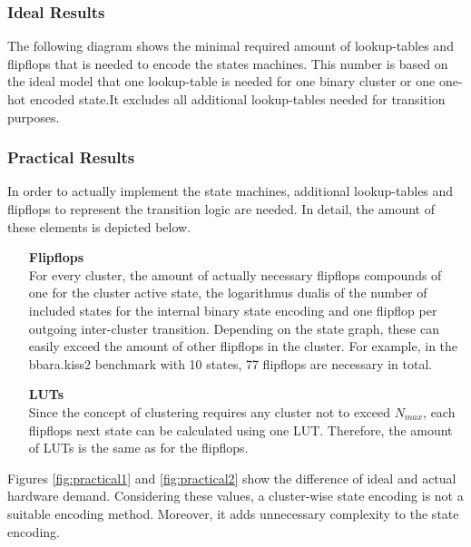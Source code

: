 \subsubsection{Ideal Results}
\label{subsubsec:IResults}

The following diagram shows the minimal required amount of lookup-tables and flipflops that is needed to encode the states machines. This number is based on the ideal model that one lookup-table is needed for one binary cluster or one one-hot encoded state.It excludes all additional lookup-tables needed for transition purposes.



\subsubsection{Practical Results}
\label{subsubsec:PResults}

In order to actually implement the state machines, additional lookup-tables and flipflops to represent the transition logic are needed. In detail, the amount of these elements is depicted below.

\begin{itemize}
\item[\textbf{Flipflops}]\hfill \\
For every cluster, the amount of actually necessary flipflops compounds of one for the cluster active state, the logarithmus dualis of the number of included states for the internal binary state encoding and one flipflop per outgoing inter-cluster transition. Depending on the state graph, these can easily exceed the amount of other flipflops in the cluster. For example,
in the bbara.kiss2 benchmark with 10 states, 77 flipflops are necessary in total.
\item[\textbf{LUTs}]\hfill \\
Since the concept of clustering requires any cluster not to exceed $N_{max}$, each flipflops next state can be calculated using one LUT. Therefore, the amount of LUTs is the same as for the flipflops.
\end{itemize}

Figures \ref{fig:practical1} and \ref{fig:practical2} show the difference of ideal and actual hardware demand. Considering these values, a cluster-wise state encoding is not a suitable encoding method. Moreover, it adds unnecessary complexity to the state encoding.

